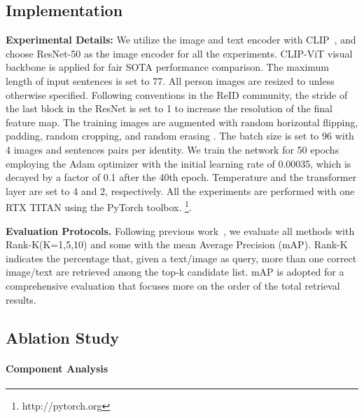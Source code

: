 \subsection{Implementation}

\textbf{Experimental Details:}
We utilize the image and text encoder with CLIP~\cite{clip}, and choose ResNet-50\cite{he2016resnet} as the image encoder for all the experiments. CLIP-ViT visual backbone is applied for fair SOTA performance comparison.
The maximum length of input sentences is set to 77.
All person images are resized to  unless otherwise specified. 
Following conventions in the ReID community, the stride of the last block in the ResNet is set to 1 to increase the resolution of the final feature map.
The training images are augmented with random horizontal flipping, padding, random cropping, and random erasing \cite{random_erase3}. 
The batch size is set to 96 with 4 images and sentences pairs per identity. 
We train the network for 50 epochs employing the Adam optimizer with the initial learning rate of 0.00035, which is decayed by a factor of 0.1 after the 40th epoch. 
Temperature  and the transformer layer  are set to 4 and 2, respectively. 
All the experiments are performed with one RTX TITAN using the PyTorch toolbox.
\footnote{http://pytorch.org}. 

\textbf{Evaluation Protocols.} Following previous work~\cite{textreid}, we evaluate all methods with Rank-K(K=1,5,10) and some with the mean Average Precision (mAP). 
Rank-K indicates the percentage that, given a text/image as query, more than one correct image/text are retrieved among the top-k candidate list.
mAP is adopted for a comprehensive evaluation that focuses more on the order of the total retrieval results.



\subsection{Ablation Study}

\paragraph{Component Analysis}


